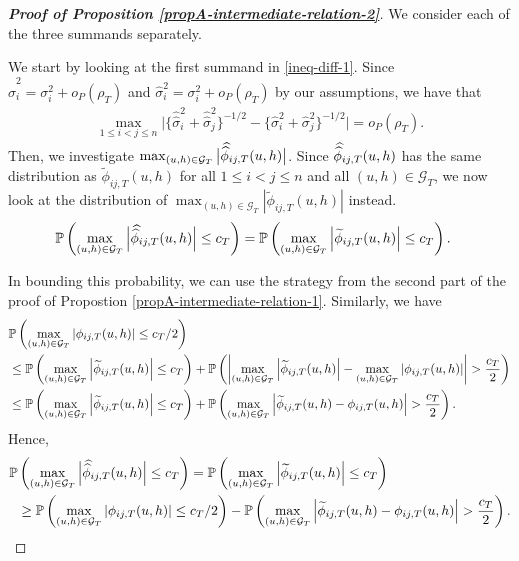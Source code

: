 \documentclass[a4paper,12pt]{article}
\newcommand{\doublehat}[1]{\skew{5.5}\widehat{\widehat{#1}}}
\newcommand{\doublehattwo}[1]{\widehat{\widehat{#1}}}
\begin{document}
\begin{proof}[\textnormal{\textbf{Proof of Proposition \ref{propA-intermediate-relation-2}}}]
We consider each of the three summands separately.

We start by looking at the first summand in \eqref{ineq-diff-1}. Since $\doublehattwo{\sigma}_i^2 = \sigma_i^2 + o_P(\rho_T)$ and $\widehat{\sigma}_i^2 = \sigma_i^2 + o_P(\rho_T)$ by our assumptions, we have that 
\begin{align}\label{ineq-diff-2}
\max_{1 \le i < j \le n} \big|\{\doublehattwo{\sigma}_i^2 + \doublehattwo{\sigma}_j^2 \}^{-1/2} - \{\widehat{\sigma}_i^2 + \widehat{\sigma}_j^2 \}^{-1/2}\big| = o_P(\rho_T).
\end{align}
Then, we investigate $ \max_{(u,h) \in \mathcal{G}_T} \big|\doublehat{\phi}_{ij,T}(u,h)\big|$. Since $\doublehat{\phi}_{ij,T}(u,h)$ has the same distribution as $\widetilde{\phi}_{ij, T}(u, h)$ for all $1\le i < j \le n$ and all $(u, h) \in \mathcal{G}_T$, we now look at the distribution of $ \max_{(u,h) \in \mathcal{G}_T}\left|\widetilde{\phi}_{ij, T}(u, h)\right|$ instead.
\begin{align*}
\pr&\left(\max_{(u,h) \in \mathcal{G}_T}\Big|\doublehat{\phi}_{ij, T}(u, h)\Big| \leq c_T\right) = \pr\left(\max_{(u,h) \in \mathcal{G}_T}\left|\widetilde{\phi}_{ij, T}(u, h)\right| \leq c_T\right).
\end{align*}

In bounding this probability, we can use the strategy from the second part of the proof of Propostion \ref{propA-intermediate-relation-1}. Similarly, we have
\begin{align*}
&\mathbb{P}\left( \max_{(u,h) \in \mathcal{G}_T}\left|\phi_{ij, T}(u, h)\right| \leq c_T/2\right) \\
&\leq \mathbb{P}\left( \max_{(u,h) \in \mathcal{G}_T}\left|\widetilde{\phi}_{ij, T}(u, h)\right| \leq c_T\right) + \mathbb{P}\left(\left|\max_{(u,h) \in \mathcal{G}_T}\left|\widetilde{\phi}_{ij, T}(u, h)\right| - \max_{(u,h) \in \mathcal{G}_T}\left|\phi_{ij, T}(u, h)\right| \right| > \frac{c_T}{2}\right) \\
&\leq \mathbb{P}\left( \max_{(u,h) \in \mathcal{G}_T}\left|\widetilde{\phi}_{ij, T}(u, h)\right| \leq c_T\right) + \mathbb{P}\left(\max_{(u,h) \in \mathcal{G}_T}\left|\widetilde{\phi}_{ij, T}(u, h)- \phi_{ij, T}(u, h)\right| > \frac{c_T}{2}\right).
\end{align*}
Hence, 
\begin{align}\label{ineq-diff-3}
\begin{split}
\pr&\left(\max_{(u,h) \in \mathcal{G}_T}\Big|\doublehat{\phi}_{ij, T}(u, h)\Big| \leq c_T\right) = \pr\left(\max_{(u,h) \in \mathcal{G}_T}\left|\widetilde{\phi}_{ij, T}(u, h)\right| \leq c_T\right)\\
&\geq \pr\left( \max_{(u,h) \in \mathcal{G}_T}\left|\phi_{ij, T}(u, h)\right| \leq c_T/2\right) - \pr\left(\max_{(u,h) \in \mathcal{G}_T}\left|\widetilde{\phi}_{ij, T}(u, h)- \phi_{ij, T}(u, h)\right| > \frac{c_T}{2}\right).
\end{split}
\end{align}


\end{proof}
\end{document}
